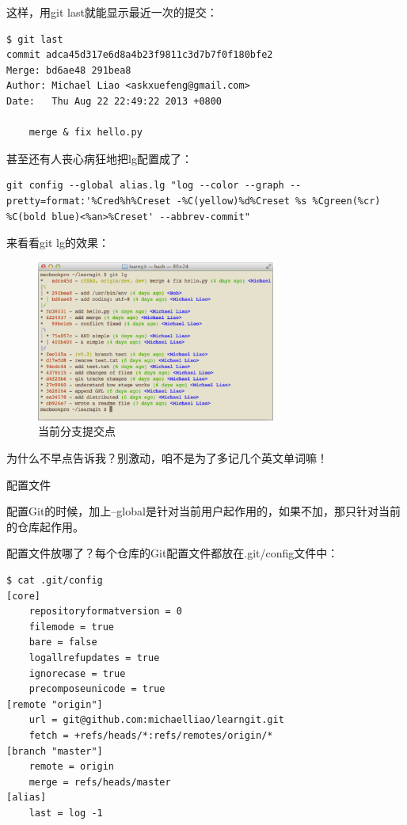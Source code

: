 这样，用git last就能显示最近一次的提交：

\begin{verbatim}
$ git last
commit adca45d317e6d8a4b23f9811c3d7b7f0f180bfe2
Merge: bd6ae48 291bea8
Author: Michael Liao <askxuefeng@gmail.com>
Date:   Thu Aug 22 22:49:22 2013 +0800

    merge & fix hello.py
\end{verbatim}

甚至还有人丧心病狂地把lg配置成了：

\begin{verbatim}
git config --global alias.lg "log --color --graph --pretty=format:'%Cred%h%Creset -%C(yellow)%d%Creset %s %Cgreen(%cr) %C(bold blue)<%an>%Creset' --abbrev-commit"
\end{verbatim}

来看看git lg的效果：

\begin{figure}[h]
  \centering
  \includegraphics[width=0.7\textwidth]{img/git-lg.png}
  \caption{当前分支提交点}
  \label{fig:git-lg}
\end{figure}

为什么不早点告诉我？别激动，咱不是为了多记几个英文单词嘛！

配置文件

配置Git的时候，加上--global是针对当前用户起作用的，如果不加，那只针对当前的仓库起作用。

配置文件放哪了？每个仓库的Git配置文件都放在.git/config文件中：

\begin{verbatim}
$ cat .git/config 
[core]
    repositoryformatversion = 0
    filemode = true
    bare = false
    logallrefupdates = true
    ignorecase = true
    precomposeunicode = true
[remote "origin"]
    url = git@github.com:michaelliao/learngit.git
    fetch = +refs/heads/*:refs/remotes/origin/*
[branch "master"]
    remote = origin
    merge = refs/heads/master
[alias]
    last = log -1
\end{verbatim}

